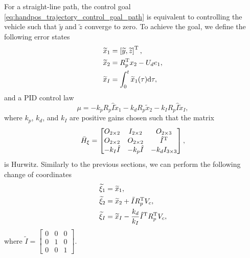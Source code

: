 For a straight-line path, the control goal \eqref{eq:handpos_trajectory_control_goal_path} is equivalent to controlling the vehicle such that $\widetilde{y}$ and $\widetilde{z}$ converge to zero.
To achieve the goal, we define the following error states
\begin{subequations}
    \begin{align}
        \widetilde{x}_1 &= \left[\widetilde{y}, \widetilde{z}\right]^{\mathrm{T}}, \\
        \widetilde{x}_2 &= R_p^{\mathrm{T}} x_2 - U_d e_1, \\
        \widetilde{x}_I &= \int_{0}^{t} \widetilde{x}_1(\tau) {\rm d}\tau,
    \end{align} 
\end{subequations}
and a PID control law
\begin{equation}
    \mu = -k_p R_p \hat{I} \widetilde{x}_1 - k_d R_p \widetilde{x}_2 - k_I R_p \hat{I} \widetilde{x}_I,
    \label{eq:handpos_trajectory_straight_line_path_PID}
\end{equation}
where $k_p$, $k_d$, and $k_I$ are positive gains chosen such that the matrix
\begin{equation}
    \Bar{H}_{\xi}
    =
    \begin{bmatrix}
        O_{2 \times 2} & I_{2 \times 2} & O_{2 \times 3} \\
        O_{2 \times 2} & O_{2 \times 2} & \hat{I}^{\mathrm{T}} \\
        -k_I \hat{I} & -k_p \hat{I} & -k_d I_{3 \times 3}
    \end{bmatrix},
    \label{eq:handpos_trajectory_H_xi_prime}
\end{equation}
is Hurwitz.
Similarly to the previous sections, we can perform the following change of coordinates
\begin{subequations}
    \begin{align}
        \widetilde{\xi}_1 &= \widetilde{x}_1, \\
        \widetilde{\xi}_2 &= \widetilde{x}_2 + \tilde{I} R_p^{\mathrm{T}} V_c, \\
        \widetilde{\xi}_I &= \widetilde{x}_I - \frac{k_d}{k_I}\hat{I}^{\mathrm{T}} R_p^{\mathrm{T}} V_c,
    \end{align} \label{eq:handpos_trajectory_error_coordinates_straight_line_path}
\end{subequations}
where $\tilde{I} = \begin{bmatrix} 0 & 0 & 0 \\ 0 & 1 & 0 \\ 0 & 0 & 1 \end{bmatrix}$.


